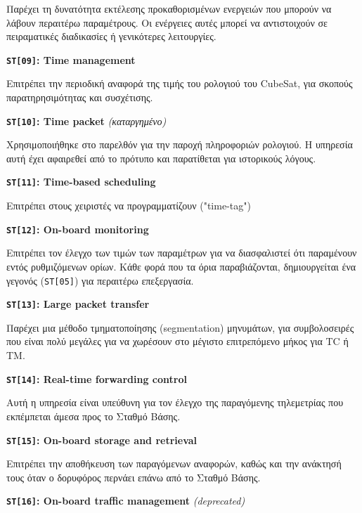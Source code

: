 \documentclass[a4paper,nobib]{tufte-book}
\begin{document}
\begin{compactitem}
		Παρέχει τη δυνατότητα εκτέλεσης προκαθορισμένων ενεργειών που μπορούν να λάβουν περαιτέρω παραμέτρους. Οι ενέργειες αυτές μπορεί να αντιστοιχούν σε πειραματικές διαδικασίες ή γενικότερες λειτουργίες.
		
		\item \textbf{\texttt{ST[09]}: Time management}
		
		Επιτρέπει την περιοδική αναφορά της τιμής του ρολογιού του CubeSat, για σκοπούς παρατηρησιμότητας και συσχέτισης.
		
		\item \textbf{\texttt{ST[10]}: Time packet} \emph{(καταργημένο)}
		
		Χρησιμοποιήθηκε στο παρελθόν για την παροχή πληροφοριών ρολογιού. Η υπηρεσία αυτή έχει αφαιρεθεί από το πρότυπο και παρατίθεται για ιστορικούς λόγους.
		
		\item \textbf{\texttt{ST[11]}: Time-based scheduling}
		
		Επιτρέπει στους χειριστές να προγραμματίζουν ("time-tag") 
		
		\item \textbf{\texttt{ST[12]}: On-board monitoring}
		
		Επιτρέπει τον έλεγχο των τιμών των παραμέτρων για να διασφαλιστεί ότι παραμένουν εντός ρυθμιζόμενων ορίων. Κάθε φορά που τα όρια παραβιάζονται, δημιουργείται ένα γεγονός (\texttt{ST[05]}) για περαιτέρω επεξεργασία.
		
		\item \textbf{\texttt{ST[13]}: Large packet transfer}
		
		Παρέχει μια μέθοδο τμηματοποίησης (segmentation) μηνυμάτων, για συμβολοσειρές που είναι πολύ μεγάλες για να χωρέσουν στο μέγιστο επιτρεπόμενο μήκος για \ac{TC} ή \ac{TM}.
		
		\item \textbf{\texttt{ST[14]}: Real-time forwarding control}
		
		Αυτή η υπηρεσία είναι υπεύθυνη για τον έλεγχο της παραγόμενης τηλεμετρίας που εκπέμπεται άμεσα προς το Σταθμό Βάσης.
		
		\item \textbf{\texttt{ST[15]}: On-board storage and retrieval}
		
		Επιτρέπει την αποθήκευση των παραγόμενων αναφορών, καθώς και την ανάκτησή τους όταν ο δορυφόρος περνάει επάνω από το Σταθμό Βάσης.
		
		\item \textbf{\texttt{ST[16]}: On-board traffic management} \emph{(deprecated)}
		

\end{compactitem}
\end{document}
